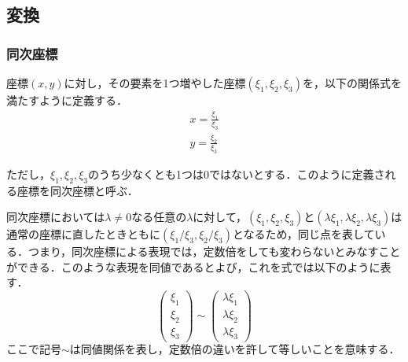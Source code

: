\documentclass[openright]{nitocs}
\numberwithin{equation}{section}
\begin{document}
        \subsection{変換}
            \subsubsection{同次座標}
                座標$(x,y)$に対し，その要素を1つ増やした座標$(\xi_1,\xi_2,\xi_3)$を，以下の関係式を満たすように定義する．\\
                \begin{equation} %
                    \begin{split} %
                        x = \frac{\xi_1}{\xi_3} \\ 
                        y = \frac{\xi_2}{\xi_3}
                    \end{split}
                    \label{Homogeneous}
                \end{equation}

                ただし，$\xi_1,\xi_2,\xi_3$のうち少なくとも1つは0ではないとする．このように定義される座標を同次座標と呼ぶ\cite{DIP}．

                同次座標においては$\lambda\neq0$なる任意の$\lambda$に対して，$(\xi_1,\xi_2,\xi_3)$と$(\lambda\xi_1,\lambda\xi_2,\lambda\xi_3)$は通常の座標に直したときともに$(\xi_1/\xi_3,\xi_2/\xi_3)$となるため，同じ点を表している．つまり，同次座標による表現では，定数倍をしても変わらないとみなすことができる．このような表現を同値であるとよび，これを式では以下のように表す．
                \begin{equation} %
                    \left(
                        \begin{array}{ccc}
                            \xi_1\\
                            \xi_2\\
                            \xi_3
                        \end{array}
                    \right) \sim %
                    \left(
                        \begin{array}{ccc}
                            \lambda\xi_1\\
                            \lambda\xi_2\\
                            \lambda\xi_3
                        \end{array}
                    \right)
                \end{equation}
                ここで記号$\sim$は同値関係を表し，定数倍の違いを許して等しいことを意味する．
\end{document}
